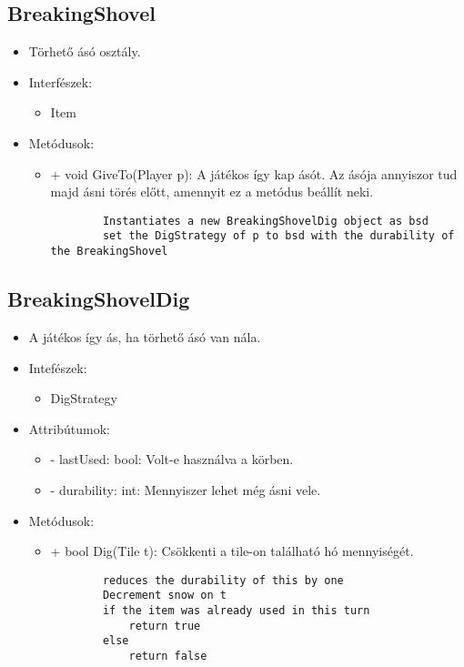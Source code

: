 \subsection{BreakingShovel}
\begin{itemize}	
	\item Törhető ásó osztály.
	\item Interfészek:
	\begin{itemize}
		\item Item
	\end{itemize}
	\item Metódusok:
	\begin{itemize}
		\item + void GiveTo(Player p): A játékos így kap ásót. Az ásója annyiszor tud majd ásni törés előtt, amennyit ez a metódus beállít neki.
		\begin{lstlisting}
		Instantiates a new BreakingShovelDig object as bsd
		set the DigStrategy of p to bsd with the durability of the BreakingShovel
		\end{lstlisting}
	\end{itemize}
\end{itemize}

\subsection{BreakingShovelDig}
\begin{itemize}
	\item A játékos így ás, ha törhető ásó van nála.
	\item Intefészek:
	\begin{itemize}
		\item DigStrategy
	\end{itemize}
	\item Attribútumok:
	\begin{itemize}
		\item - lastUsed: bool: Volt-e használva a körben.
		\item - durability: int: Mennyiszer lehet még ásni vele.
	\end{itemize}
	\item Metódusok:
	\begin{itemize}
		\item + bool Dig(Tile t): Csökkenti a tile-on található hó mennyiségét.
		\begin{lstlisting}
		reduces the durability of this by one
		Decrement snow on t
		if the item was already used in this turn
			return true
		else
			return false
		\end{lstlisting}
	\end{itemize}
\end{itemize}

